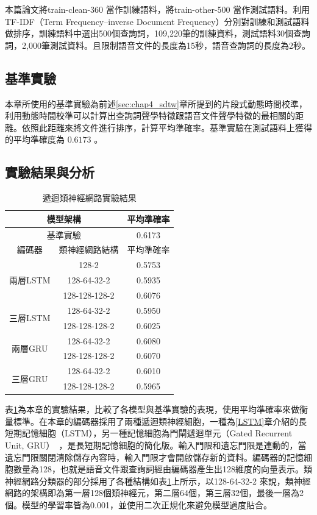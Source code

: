  本篇論文將train-clean-360 當作訓練語料，將train-other-500
 當作測試語料。利用TF-IDF（Term Frequency–inverse Document
 Frequency）分別對訓練和測試語料做排序，訓練語料中選出500個查詢詞，109,220筆的訓練資料，測試語料30個查詢詞，2,000筆測試資料。且限制語音文件的長度為15秒，語音查詢詞的長度為2秒。
\subsection{基準實驗}
本章所使用的基準實驗為前述\ref{sec:chap4_sdtw}章所提到的片段式動態時間校準，利用動態時間校準可以計算出查詢詞聲學特徵跟語音文件聲學特徵的最相關的距離。依照此距離來將文件進行排序，計算平均準確率。基準實驗在測試語料上獲得的平均準確度為 $ 0.6173 $ 。
\subsection{實驗結果與分析}
 \begin{table}[ht]
	 \centering
	 \caption{遞迴類神經網路實驗結果}

	 \label{table:ch3_exp}
	 \begin{tabular}{|c|c|c|}
		 \hline
		 \multicolumn{2}{|c|}{模型架構} & 平均準確率 \\
		 \hline
		 \multicolumn{2}{|c|}{基準實驗} & 0.6173 \\
		 \hline
		 \hline 

		 編碼器 & 類神經網路結構 & 平均準確率  \\
		 \hline

		 \multirow{3}{*}{兩層LSTM} & 128-2 & 0.5753\\
		 \cline{2-3}
		 & 128-64-32-2 & 0.5935 \\
		 \cline{2-3}
		 & 128-128-128-2 & 0.6076\\
		 \hline
		 \multirow{2}{*}{三層LSTM} & 128-64-32-2 & 0.5950 \\
		 \cline{2-3}
		 & 128-128-128-2 & 0.6025 \\
		 \hline

		 \multirow{2}{*}{兩層GRU} & 128-64-32-2  &  0.6080\\
		 \cline{2-3}
		 & 128-128-128-2 & 0.6070 \\
		 \hline
		 \multirow{2}{*}{三層GRU} & 128-64-32-2  & 0.6010 \\
		 \cline{2-3}
		 & 128-128-128-2 & 0.5965 \\
		 \hline
	   \end{tabular}
 \end{table}

表\ref{table:ch3_exp}為本章的實驗結果，比較了各模型與基準實驗的表現，使用平均準確率來做衡量標準。在本章的編碼器採用了兩種遞迴類神經細胞，一種為\ref{LSTM}章介紹的長短期記憶細胞（LSTM），另一種記憶細胞為門閘遞迴單元（Gated
Recurrent Unit,
GRU）~\cite{cho2014learning}，是長短期記憶細胞的簡化版。輸入門限和遺忘門限是連動的，當遺忘門限關閉清除儲存內容時，輸入門限才會開啟儲存新的資料。編碼器的記憶細胞數量為128，也就是語音文件跟查詢詞經由編碼器產生出128維度的向量表示。類神經網路分類器的部分採用了各種結構如表\ref{table:ch3_exp}上所示，以128-64-32-2
來說，類神經網路的架構即為第一層128個類神經元，第二層64個，第三層32個，最後一層為2個。模型的學習率皆為0.001，並使用二次正規化來避免模型過度貼合。

